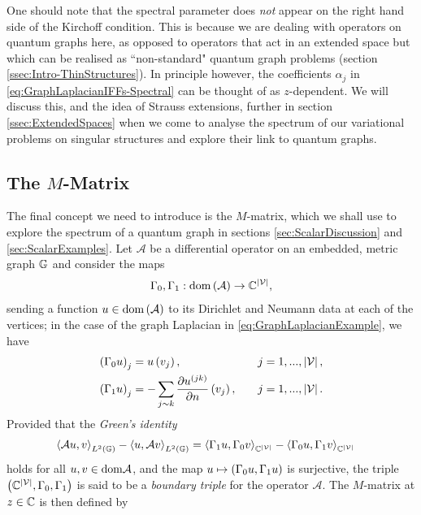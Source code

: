 One should note that the spectral parameter does \emph{not} appear on the right hand side of the Kirchoff condition.
This is because we are dealing with operators on quantum graphs here, as opposed to operators that act in an extended space but which can be realised as ``non-standard" quantum graph problems (section \ref{ssec:Intro-ThinStructures}).
In principle however, the coefficients $\alpha_j$ in \eqref{eq:GraphLaplacianIFFs-Spectral} can be thought of as $z$-dependent.
We will discuss this, and the idea of Strauss extensions, further in section \ref{ssec:ExtendedSpaces} when we come to analyse the spectrum of our variational problems on singular structures and explore their link to quantum graphs.


\subsection{The $M$-Matrix} \label{ssec:MMatrix}
The final concept we need to introduce is the $M$-matrix, which we shall use to explore the spectrum of a quantum graph in sections \ref{sec:ScalarDiscussion} and \ref{sec:ScalarExamples}.
Let $\mathcal{A}$ be a differential operator on an embedded, metric graph $\mathbb{G}$ and consider the maps
\begin{align*}
	\Gamma_0, \Gamma_1: \mathrm{dom}\left( \mathcal{A} \right) \rightarrow \mathbb{C}^{\left\lvert \mathcal{V} \right\rvert},
\end{align*}
sending a function $u\in\mathrm{dom}\left( \mathcal{A} \right)$ to its Dirichlet and Neumann data at each of the vertices; in the case of the graph Laplacian in \eqref{eq:GraphLaplacianExample}, we have
\begin{align} \label{eq:GraphDNMapDef}
	\left( \Gamma_0 u \right)_j &= u\left( v_j \right), \quad &j=1,...,\left\lvert \mathcal{V} \right\rvert, \\
	\left( \Gamma_1 u \right)_j &= -\sum_{j\sim k}\dfrac{\partial u^{(jk)}}{\partial n}\left( v_j \right), \quad &j=1,...,\left\lvert \mathcal{V} \right\rvert. 
\end{align}
Provided that the \emph{Green's identity}
\begin{align} \label{eq:GraphGreensIdentity}
	\left\langle \mathcal{A}u , v \right\rangle_{L^2\left( \mathbb{G} \right)} - \left\langle u , \mathcal{A}v \right\rangle_{L^2\left( \mathbb{G} \right)}
	&= \left\langle \Gamma_1 u , \Gamma_0 v \right\rangle_{\mathbb{C}^{\left\lvert \mathcal{V} \right\rvert}} - \left\langle \Gamma_0 u , \Gamma_1 v \right\rangle_{\mathbb{C}^{\left\lvert \mathcal{V} \right\rvert}}
\end{align}
holds for all $u,v\in\mathrm{dom}\mathcal{A}$, and the map $u\mapsto\left( \Gamma_0 u, \Gamma_1 u \right)$ is surjective, the triple $\left( \mathbb{C}^{\left\lvert \mathcal{V} \right\rvert},\Gamma_0,\Gamma_1 \right)$ is said to be a \emph{boundary triple} for the operator $\mathcal{A}$.
The $M$-matrix at $z\in\mathbb{C}$ is then defined by
